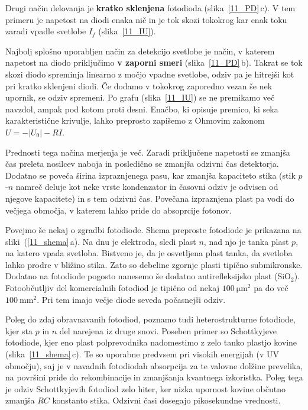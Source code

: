 Drugi način delovanja je {\bf kratko sklenjena} fotodioda (slika~\ref{11_PD}\,c). V tem primeru je 
napetost na diodi enaka nič in je tok skozi tokokrog kar enak toku zaradi vpadle svetlobe $I_f$
(slika~\ref{11_IU}).

Najbolj splošno uporabljen način za detekcijo svetlobe je način, v katerem napetost na diodo 
priključimo {\bf v zaporni smeri} (slika~\ref{11_PD}\,b).
Takrat se tok skozi diodo spreminja linearno z močjo vpadne svetlobe, odziv pa je hitrejši
kot pri kratko sklenjeni diodi. Če dodamo v tokokrog zaporedno vezan še nek upornik, se odziv
spremeni. Po grafu (slika~\ref{11_IU}) se ne premikamo več navzdol, ampak pod kotom proti desni.
Enačbo, ki opisuje premico, ki seka karakteristične krivulje, lahko preprosto zapišemo
z Ohmovim zakonom $U = -|U_0|-RI$. 

Prednosti tega načina merjenja je več. Zaradi priključene napetosti se zmanjša čas preleta
nosilcev naboja in posledično se zmanjša odzivni čas detektorja. Dodatno se poveča
širina izpraznjenega pasu, kar zmanjša kapaciteto stika (stik $p$-$n$ namreč deluje kot neke vrste 
kondenzator in časovni odziv je odvisen od njegove kapacitete) in s tem odzivni čas. Povečana
izpraznjena plast pa vodi do večjega območja, v katerem lahko pride do absoprcije fotonov. 

Povejmo še nekaj o zgradbi fotodiode. Shema preproste fotodiode je prikazana na sliki~(\ref{11_shema}\,a).
Na dnu je elektroda, sledi plast $n$, nad njo je tanka plast $p$, na katero vpada svetloba.
Bistveno je, da je osvetljena plast tanka, da svetloba lahko prodre v bližino stika. Zato so 
debeline zgornje plasti tipično submikronske. Dodatno na fotodiode pogosto nanesemo
še dodatno antirefleksijsko plast (SiO$_2$). Fotoobčutljiv del komercialnih fotodiod
je tipično od nekaj $100~\si{\micro\meter}^2$ pa do več $100~\si{\milli\metre}^2$. Pri 
tem imajo večje diode seveda počasnejši odziv. 

\begin{remark}
Poleg do zdaj obravnavanih fotodiod, poznamo tudi heterostrukturne fotodiode, kjer sta $p$ in $n$ del
narejena iz druge snovi. Poseben primer so Schottkyjeve fotodiode, kjer eno plast polprevodnika
nadomestimo z zelo tanko plastjo kovine (slika~\ref{11_shema}\,c). Te so uporabne predvsem pri 
visokih energijah (v UV območju), 
saj je v navadnih fotodiodah absorpcija za te valovne dolžine prevelika, na površini pride do 
rekombinacije in zmanjšanja kvantnega izkoristka. Poleg tega je odziv Schottkyjevih fotodiod zelo hiter, 
ker nizka upornost kovine občutno zmanjša $RC$ konstanto stika. Odzivni časi dosegajo pikosekundne vrednosti. 
\end{remark}

